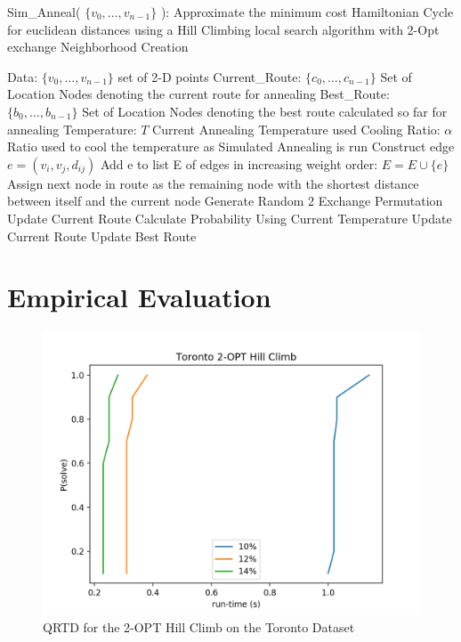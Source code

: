 \documentclass[format=sigconf]{acmart}
\begin{document}
\begin{algorithm}[H] 
	\caption{  Sim\_Anneal( $\{v_0, \hdots, v_{n-1}\}$ ): Approximate the minimum cost Hamiltonian Cycle for euclidean distances using a Hill Climbing local search algorithm with 2-Opt exchange Neighborhood Creation}
	\begin{algorithmic} 
		\STATE Data: $\{v_0, \hdots, v_{n-1}\}$ set of 2-D points
		\STATE Current\_Route: $\{c_0, \hdots, c_{n-1}\}$ Set of Location Nodes denoting the current route for annealing
		\STATE Best\_Route: $\{b_0, \hdots, b_{n-1}\}$ Set of Location Nodes denoting the best route calculated so far for annealing
		\STATE Temperature: $T$ Current Annealing Temperature used
		\STATE Cooling Ratio: $\alpha$ Ratio used to cool the temperature as Simulated Annealing is run
			\STATE Construct edge $e = (v_i, v_j, d_{ij})$
			\STATE Add e to list E of edges in increasing weight order: $E = E \cup \{e\}$
		\ENDFOR
			\STATE Assign next node in route as the remaining node with the shortest distance between itself and the current node
		\ENDWHILE
			\STATE Generate Random 2 Exchange Permutation
				\STATE Update Current Route
			\ELSE
				\STATE Calculate Probability Using Current Temperature
					\STATE Update Current Route
				\ENDIF
			\ENDIF
				\STATE Update Best Route
			\ENDIF
		\ENDWHILE
	\end{algorithmic}
\end{algorithm}
\section*{Empirical Evaluation}
 
 
 
 

\begin{figure}[htbp]
    \centerline{\includegraphics[scale=.5]{graphs/Toronto_LS1_QRTD.png}}
    \caption{QRTD for the 2-OPT Hill Climb on the Toronto Dataset}
    \label{fig:1}
\end{figure}
\end{document}
